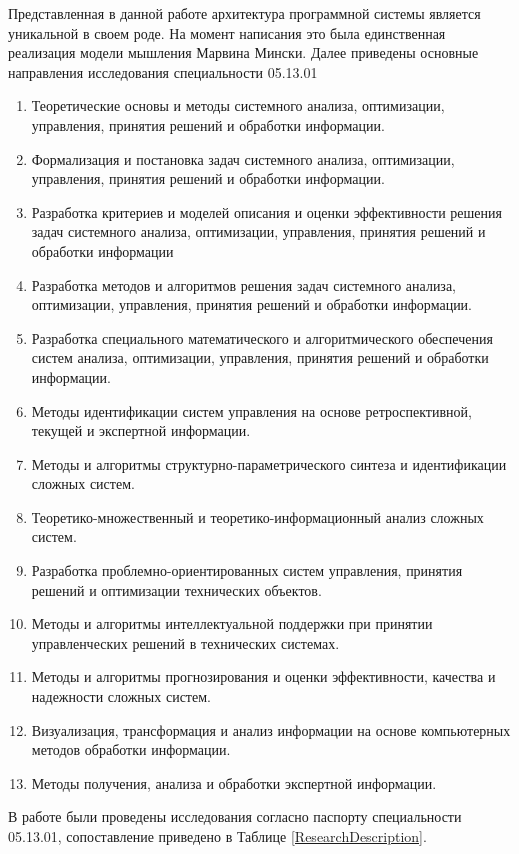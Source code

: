 Представленная в данной работе архитектура программной системы является уникальной в своем роде. На момент написания это была единственная реализация модели мышления Марвина Мински.
Далее приведены основные направления исследования специальности 05.13.01
\begin{enumerate}
	\item Теоретические основы и методы системного анализа, оптимизации, управления, принятия решений и обработки информации. 
	\item Формализация и постановка задач системного анализа, оптимизации, управления, принятия решений и обработки информации. 
	\item Разработка критериев и моделей описания и оценки эффективности решения задач системного анализа, оптимизации, управления, принятия решений и обработки информации 
	\item Разработка методов и алгоритмов решения задач системного анализа, оптимизации, управления, принятия решений и обработки информации. 
	\item	Разработка специального математического и алгоритмического обеспечения систем анализа, оптимизации, управления, принятия решений и обработки информации. 
	\item	Методы идентификации систем управления на основе ретроспективной, текущей и экспертной информации. 
	\item	Методы и алгоритмы структурно-параметрического синтеза и идентификации сложных систем. 
	\item	Теоретико-множественный и теоретико-информационный анализ сложных систем. 
	\item	Разработка проблемно-ориентированных систем управления, принятия решений и оптимизации технических объектов. 
	\item	Методы и алгоритмы интеллектуальной поддержки при принятии управленческих решений в технических системах. 
	\item	Методы и алгоритмы прогнозирования и оценки эффективности, качества и надежности сложных систем. 
	\item	Визуализация, трансформация и анализ информации на основе компьютерных методов обработки информации. 
	\item	Методы получения, анализа и обработки экспертной информации.
\end{enumerate} 

В работе были проведены исследования согласно паспорту специальности 05.13.01, сопоставление приведено в Таблице \ref{ResearchDescription}.

